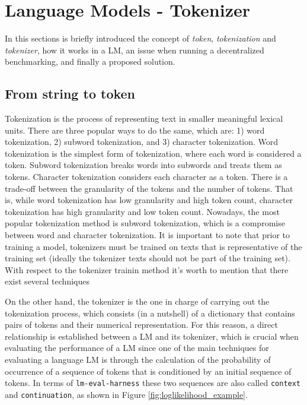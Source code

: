 \section{Language Models - Tokenizer}\label{sec:b}

In this sections is briefly introduced the concept of \textit{token}, \textit{tokenization} and \textit{tokenizer}, how it works in a \gls{LM}, an issue when running a decentralized benchmarking, and finally a proposed solution. 

\subsection{From string to token}\label{subsec:b1}

Tokenization is the process of representing text in smaller meaningful lexical units. 
There are three popular ways to do the same, which are: 1) word tokenization, 2) subword tokenization, and 3) character tokenization. 
Word tokenization is the simplest form of tokenization, where each word is considered a token. 
Subword tokenization breaks words into subwords and treats them as tokens. 
Character tokenization considers each character as a token. 
There is a trade-off between the granularity of the tokens and the number of tokens. 
That is, while word tokenization has low granularity and high token count, character tokenization has high granularity and low token count. 
Nowadays, the most popular tokenization method is subword tokenization, which is a compromise between word and character tokenization.
It is important to note that prior to training a model, tokenizers must be trained on texts that is representative of the training set (ideally the tokenizer texts should not be part of the training set). 
With respect to the tokenizer trainin method it's worth to mention that there exist several techniques \cite{kudo_sentencepiece_2018,kudo_subword_2018,sennrich_neural_2016}

On the other hand, the tokenizer is the one in charge of carrying out the tokenization process, which consists (in a nutshell) of a dictionary that contains pairs of tokens and their numerical representation. 
For this reason, a direct relationship is established between a \gls{LM} and its tokenizer, which is crucial when evaluating the performance of a \gls{LM} since one of the main techniques for evaluating a language \gls{LM} is through the calculation of the probability of occurrence of a sequence of tokens that is conditioned by an initial sequence of tokens. 
In terms of \texttt{lm-eval-harness}\cite{biderman_lessons_2024} these two sequences are also called \texttt{context} and \texttt{continuation}, as shown in Figure \ref{fig:loglikelihood_example}.

